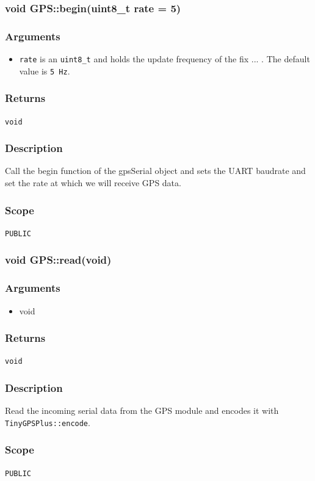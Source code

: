 \documentclass[a4paper,10pt]{article}
\newcommand{\func}[1]{\texttt{#1}}
\newenvironment{method}[2]{%
	\newcommand\funname{\func{#1}}
	\subsubsection[#1]{#2}
	
	\newenvironment{methodargs}{%
		\subsubsection*{Arguments}
	}{}
	
	\newenvironment{methodreturns}{%
		\subsubsection*{Returns}
	}{}
	
	\newenvironment{methoddesc}{%
		\subsubsection*{Description}
	}{}

	\newenvironment{methodscope}{
		\subsubsection*{Scope}
	}{}
}{}
\begin{document}
			\begin{method}{begin}{void GPS::begin(uint8\_t rate = 5)}
				\begin{methodargs}
					\begin{itemize}
						\item \texttt{rate} is an \texttt{uint8\_t} and holds the update frequency of the fix ... . The default value is \texttt{5 Hz}. 
					\end{itemize}
				\end{methodargs}
			
				\begin{methodreturns}
					\texttt{void}
				\end{methodreturns}
			
				\begin{methoddesc}
					Call the begin function of the gpsSerial object and sets the UART baudrate and set the rate at which we will receive GPS data. 
				\end{methoddesc}
			
				\begin{methodscope}
					\texttt{PUBLIC}
				\end{methodscope}
			
				\vspace{3ex}
			\end{method}
			
			\begin{method}{read}{void GPS::read(void)}
				\begin{methodargs}
					\begin{itemize}
							\item void
						\end{itemize}
				\end{methodargs}
				
				\begin{methodreturns}
					\texttt{void}
				\end{methodreturns}
				
				\begin{methoddesc}
					Read the incoming serial data from the GPS module and encodes it with \texttt{TinyGPSPlus::encode}. 
				\end{methoddesc}
				
				\begin{methodscope}
					\texttt{PUBLIC}
				\end{methodscope}
				
				\vspace{3ex}
			\end{method}
		
\end{document}
